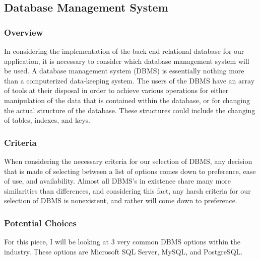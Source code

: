 \documentclass[onecolumn, draftclsnofoot,10pt, compsoc]{IEEEtran}
\begin{document}
\subsection{Database Management System}

\subsubsection{Overview}
In considering the implementation of the back end relational database for our application, it is necessary to consider which database management system will be used. A database management system (DBMS) is essentially nothing more than a computerized data-keeping system. The users of the DBMS have an array of tools at their disposal in order to achieve various operations for either manipulation of the data that is contained within the database, or for changing the actual structure of the database. These structures could include the changing of tables, indexes, and keys.

\subsubsection{Criteria}
When considering the necessary criteria for our selection of DBMS, any decision that is made of selecting between a list of options comes down to preference, ease of use, and availability. Almost all DBMS's in existence share many more similarities than differences, and considering this fact, any harsh criteria for our selection of DBMS is nonexistent, and rather will come down to preference.

\subsubsection{Potential Choices }
For this piece, I will be looking at 3 very common DBMS options within the industry. These options are Microsoft SQL Server, MySQL, and PostgreSQL.
\end{document}
